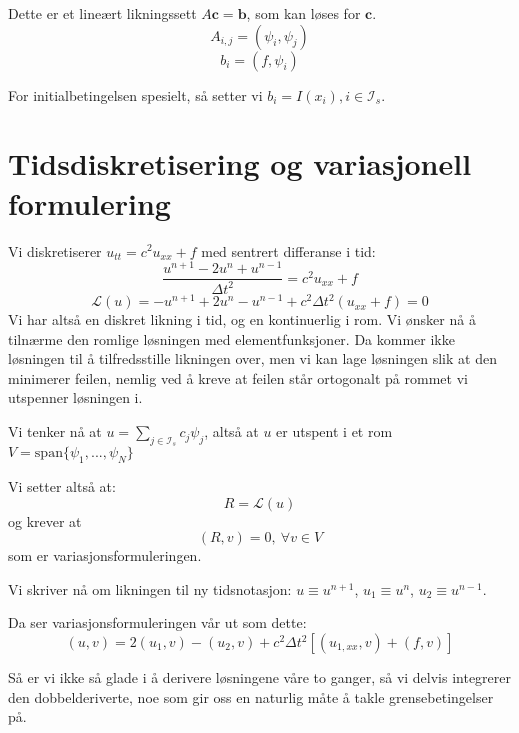 \documentclass[a4paper, 10pt]{article}
\newcommand{\mb}{\mathbf}
\newcommand{\mc}{\mathcal}
\begin{document}
Dette er et lineært likningssett $A\mb{c} = \mb{b}$, som kan løses for $\mb{c}$.
\begin{equation}
	A_{i, j} = (\psi_i, \psi_j)
\end{equation}
\begin{equation}
	b_i = (f, \psi_i)
\end{equation}

For initialbetingelsen spesielt, så setter vi $b_i = I(x_i), i \in \mc{I}_s$.

\section{Tidsdiskretisering og variasjonell formulering}
Vi diskretiserer $u_{tt} = c^2 u_{xx} + f$ med sentrert differanse i tid:
\begin{equation}
	\frac{u^{n+1} - 2 u^n + u^{n-1}}{\Delta t^2} = c^2 u_{xx} + f
\end{equation}
\begin{equation}
	 \mathcal{L}(u) = -u^{n+1} +2u^n - u^{n-1} + c^2 \Delta t^2 (u_{xx} + f) = 0
\end{equation}
Vi har altså en diskret likning i tid, og en kontinuerlig i rom. Vi ønsker nå å tilnærme den romlige løsningen med elementfunksjoner. Da kommer ikke løsningen til å tilfredsstille likningen over, men vi kan lage løsningen slik at den minimerer feilen, nemlig ved å kreve at feilen står ortogonalt på rommet vi utspenner løsningen i.

Vi tenker nå at $u = \sum_{j \in \mc{I}_s} c_j \psi_j$, altså at $u$ er utspent i et rom $V = \mbox{span}\{\psi_1, ..., \psi_N\}$

Vi setter altså at:
\begin{equation}
	R = \mathcal{L}(u)
\end{equation}
og krever at
\begin{equation}
	(R, v) = 0, \ \forall v \in V
\end{equation}
som er variasjonsformuleringen.

Vi skriver nå om likningen til ny tidsnotasjon: $u \equiv u^{n+1}$, $u_1 \equiv u^n$, $u_2 \equiv u^{n-1}$.

Da ser variasjonsformuleringen vår ut som dette:
\begin{equation}
(u, v) = 2(u_1, v) - (u_2, v) + c^2\Delta t^2\left[(u_{1, xx}, v) + (f, v)\right]
\end{equation}

Så er vi ikke så glade i å derivere løsningene våre to ganger, så vi delvis integrerer den dobbelderiverte, noe som gir oss en naturlig måte å takle grensebetingelser på.
\end{document}
